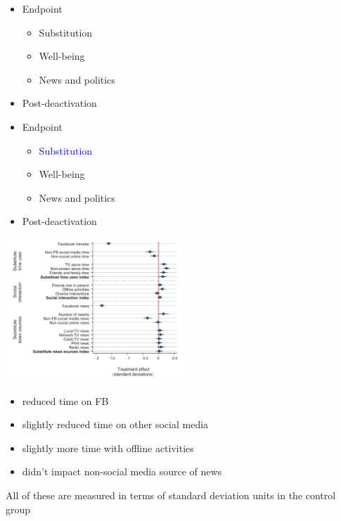 \documentclass[aspectratio=169]{beamer}
\begin{document}
\begin{frame}

\begin{itemize}
\item Endpoint
\begin{itemize}
\item Substitution
\item Well-being
\item News and politics
\end{itemize}
\item Post-deactivation
\end{itemize}

\end{frame}
\begin{frame}

\begin{itemize}
\item Endpoint
\begin{itemize}
\item \textcolor{blue}{Substitution}
\item Well-being
\item News and politics
\end{itemize}
\item Post-deactivation
\end{itemize}

\end{frame}
\begin{frame}

\begin{center}
\includegraphics[width=0.5\textwidth]{figures/allcott_welfare_2020_fig2}
\end{center}

\begin{itemize}
\item reduced time on FB \pause
\item slightly reduced time on other social media \pause
\item slightly more time with offline activities \pause
\item didn't impact non-social media source of news \pause
\end{itemize}
\vfill
All of these are measured in terms of standard deviation units in the control group

\end{frame}
\end{document}
